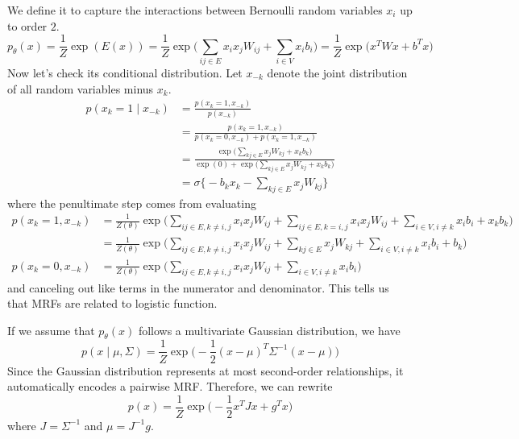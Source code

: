\documentclass{article}
\begin{document}
  \begin{example}
    We define it to capture the interactions between Bernoulli random variables $x_i$ up to order $2$. 
    \begin{equation}
      p_{\theta} (x) = \frac{1}{Z} \exp( E(x)) = \frac{1}{Z} \exp \bigg( \sum_{i j \in E} x_i x_j W_{ij} + \sum_{i \in V} x_i b_i \bigg) = \frac{1}{Z} \exp \big( x^T W x + b^T x \big)
    \end{equation}
    Now let's check its conditional distribution. Let $x_{-k}$ denote the joint distribution of all random variables minus $x_k$.  
    \begin{align}
      p(x_k = 1 \mid x_{-k}) & = \frac{p(x_k = 1, x_{-k})}{p(x_{-k})} \\
                             & = \frac{p(x_k = 1, x_{-k})}{p(x_k = 0, x_{-k}) + p(x_k = 1, x_{-k})} \\
                             & = \frac{\exp \Big( \sum_{k j \in E} x_j W_{kj} + x_k b_k \Big)}{\exp(0) + \exp \Big(\sum_{k j \in E} x_j W_{kj} + x_k b_k \Big)} \\
                             & = \sigma \bigg\{ - b_k x_k - \sum_{k j \in E} x_j W_{k j} \bigg\} 
    \end{align}
    where the penultimate step comes from evaluating 
    \begin{align} 
      p(x_k = 1, x_{-k}) & = \frac{1}{Z(\theta)} \exp \bigg( \sum_{ij \in E, k \neq i, j} x_i x_j W_{ij} + \sum_{i j \in E, k = i, j} x_i x_j W_{ij} + \sum_{i \in V, i \neq k} x_i b_i + x_k b_k \bigg) \\
                         & =\frac{1}{Z(\theta)} \exp \bigg( \sum_{ij \in E, k \neq i, j} x_i x_j W_{ij} + \sum_{k j \in E} x_j W_{kj} + \sum_{i \in V, i \neq k} x_i b_i + b_k \bigg)  \\ 
      p(x_k = 0, x_{-k}) & = \frac{1}{Z(\theta)} \exp \bigg( \sum_{ij \in E, k \neq i, j} x_i x_j W_{ij} + \sum_{i \in V, i \neq k} x_i b_i\bigg)  
    \end{align}
    and canceling out like terms in the numerator and denominator. This tells us that MRFs are related to logistic function.  
  \end{example}

  \begin{example} 
    If we assume that $p_{\theta} (x)$ follows a multivariate Gaussian distribution, we have 
    \begin{equation}
      p(x \mid \mu, \Sigma) = \frac{1}{Z} \exp \bigg( -\frac{1}{2} (x - \mu)^T \Sigma^{-1} (x - \mu) \bigg)
    \end{equation}
    Since the Gaussian distribution represents at most second-order relationships, it automatically encodes a pairwise MRF. Therefore, we can rewrite 
    \begin{equation}
      p(x) = \frac{1}{Z} \exp \bigg( -\frac{1}{2} x^T Jx + g^T x \bigg)
    \end{equation}
    where $J = \Sigma^{-1}$ and $\mu = J^{-1} g$. 
  \end{example}
\end{document}
